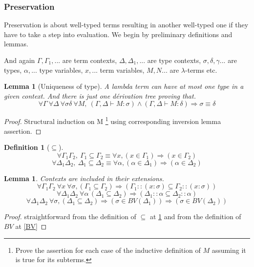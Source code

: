 \documentclass{article}
\newtheorem{lemma}[theorem]{Lemma}
\newtheorem{definition}{Definition}[section]
\begin{document}
    \subsubsection{Preservation}
    Preservation is about well-typed terms resulting in another well-typed one if they have to take a step into evaluation. We begin by preliminary definitions and lemmas.\par And again  $\Gamma, \Gamma_1, ...$ are term contexts, $\Delta, \Delta_1,...$ are type contexts, $\sigma, \delta, \gamma ...$ are types, $\alpha, ...$ type variables, $x, ...$ term variables, $M, N...$ are $\lambda$-terms etc.

    \begin{lemma}[Uniqueness of type]\label{uniqueness of type}
        A lambda term can have at most one type in a given context. And there is just one dérivation tree proving that.
        $$\forall\Gamma\ \forall\Delta\ \forall\sigma\delta\ \forall M,\ (\Gamma,\Delta \vdash M : \sigma) \wedge (\Gamma,\Delta \vdash M : \delta) \Rightarrow \sigma \equiv \delta$$
    \end{lemma}
    
    \begin{proof}
        Structural induction on M 
        \footnote{Prove the assertion for each case of the inductive definition of $M$ assuming it is true for its subterms.}
        using corresponding inversion lemma assertion.
    \end{proof}

    \begin{definition}[$\subseteq$]\label{subseteq}
        $$\forall \Gamma_1\Gamma_2, \ \Gamma_1\subseteq\Gamma_2 \equiv \forall x, (x \in \Gamma_1) \Rightarrow (x \in \Gamma_2)$$
        $$\forall \Delta_1\Delta_2, \ \Delta_1\subseteq\Delta_2 \equiv \forall \alpha, (\alpha \in \Delta_1) \Rightarrow (\alpha \in\Delta_2)$$
    \end{definition}

    \begin{lemma} Contexts are included in their extensions.
        $$\forall \Gamma_1\Gamma_2\ \forall x\ \forall \sigma, (\Gamma_1\subseteq\Gamma_2) \Rightarrow (\Gamma_1::(x : \sigma)\subseteq\Gamma_2::(x : \sigma))$$
        $$\forall \Delta_1\Delta_2\ \forall \alpha\, (\Delta_1\subseteq\Delta_2) \Rightarrow (\Delta_1::\alpha\subseteq\Delta_2::\alpha)$$
        $$\forall \Delta_1\Delta_2\ \forall \sigma, (\Delta_1\subseteq\Delta_2) \Rightarrow (\sigma\in BV(\Delta_1)) \Rightarrow (\sigma\in BV(\Delta_2))$$
    
    \end{lemma}
    \begin{proof}
straightforward from the definition of $\subseteq$ at \ref{subseteq} and from the definition of $BV$ at \ref{BV}  
    \end{proof}
\end{document}
